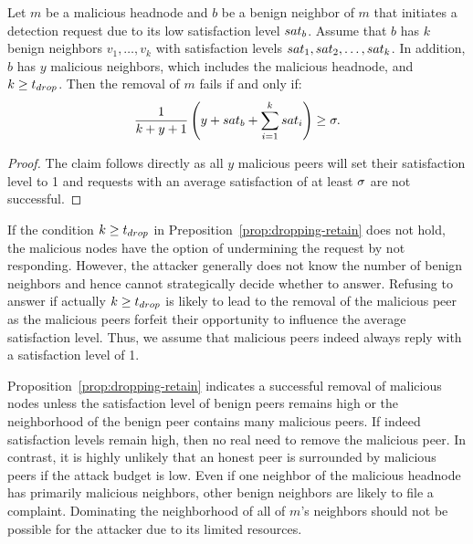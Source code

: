 \begin{proposition}
\label{prop:dropping-retain}
Let $m$ be a malicious headnode and $b$ be a benign neighbor of $m$ that initiates a detection request due to its low satisfaction level $sat_b$.
Assume that $b$ has $k$ benign neighbors $v_1, \ldots , v_k$ with satisfaction levels $sat_1, sat_2 ,\ldots  , sat_k$. In addition, $b$ has $y$ malicious neighbors, which includes the malicious headnode, and $k\geq t_{drop}$.
 Then the removal of $m$ fails if and only if: 
\begin{align}
\label{eq:drop-retain}
\frac{1}{k+y+1}\left(y+\sat_b + \sum_{i=1}^k \sat_i\right) \geq \satThres.  
\end{align} 
\end{proposition}
\begin{proof}
The claim follows directly as all $y$ malicious peers will set their satisfaction level to 1 and \drop requests with an average satisfaction of at least $\sigma$ are not successful.   
\end{proof}
If the condition $k\geq t_{drop}$ in Preposition~\ref{prop:dropping-retain} does not hold, the malicious nodes have the option of undermining the request by not responding. 
However, the attacker generally does not know the number of benign neighbors and hence cannot strategically decide whether to answer. 
Refusing to answer if actually $k\geq t_{drop}$ is likely to lead to the removal of the malicious peer as the malicious peers forfeit their opportunity to influence the average satisfaction level. 
Thus, we assume that malicious peers indeed always reply with a satisfaction level of 1. 

Proposition~\ref{prop:dropping-retain} indicates a successful removal of malicious nodes unless the satisfaction level of benign peers remains high or the neighborhood of the benign peer contains many malicious peers. 
If indeed satisfaction levels remain high, then no real need to remove the malicious peer.
In contrast, it is highly unlikely that an honest peer is surrounded by malicious peers if the attack budget is low.
Even if one neighbor of the malicious headnode has primarily malicious neighbors, other benign neighbors are likely to file a complaint.
Dominating the neighborhood of all of $m$'s neighbors should not be possible for the attacker due to its limited resources.

 
 